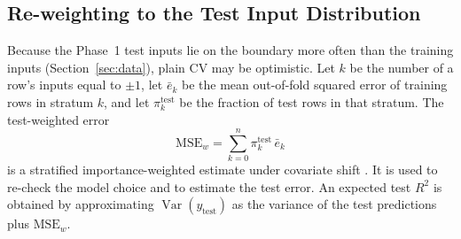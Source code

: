 \documentclass[conference]{IEEEtran}
\begin{document}
\subsection{Re-weighting to the Test Input Distribution}
Because the Phase~1 test inputs lie on the boundary more often than the training inputs (Section~\ref{sec:data}), plain CV may be optimistic. Let $k$ be the number of a row's inputs equal to $\pm1$, let $\bar e_k$ be the mean out-of-fold squared error of training rows in stratum $k$, and let $\pi_k^{\text{test}}$ be the fraction of test rows in that stratum. The test-weighted error
\begin{equation}
\text{MSE}_{w}=\sum_{k=0}^{n}\pi_k^{\text{test}}\,\bar e_k
\label{eq:wmse}
\end{equation}
is a stratified importance-weighted estimate under covariate shift \cite{shimodaira2000}. It is used to re-check the model choice and to estimate the test error. An expected test $R^2$ is obtained by approximating $\operatorname{Var}(y_{\text{test}})$ as the variance of the test predictions plus $\text{MSE}_w$.
\end{document}
